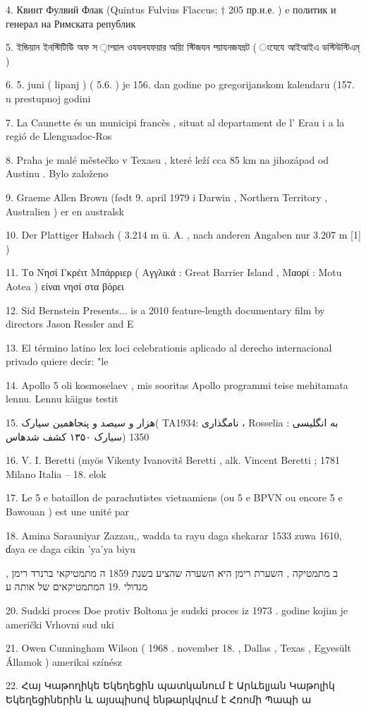 4. Квинт Фулвий Флак (Quintus Fulvius Flaccus; † 205 пр.н.е. ) e политик и генерал на
Римската републик

5. ইন্ডিয়ান ইনস্টিটিউি অফ স ়াশ্য়াল ওযযলযফয়ার অয়াি স্টিজযন ম্য়াযনজযম্ন্ট
( ংযেযে আইআইএ ডস্টিউস্টিএম্ )

6. 5. juni ( lipanj ) ( 5.6. ) je 156. dan godine po gregorijanskom kalendaru (157. u
prestupnoj godini

7. La Caunette és un municipi francès , situat al departament de l' Erau i a la regió de
Llenguadoc-Ros

8. Praha je malé městečko v Texasu , které leží cca 85 km na jihozápad od Austinu . Bylo
založeno

9. Graeme Allen Brown (født 9. april 1979 i Darwin , Northern Territory , Australien ) er
en australsk

10. Der Plattiger Habach ( 3.214 m ü. A. , nach anderen Angaben nur 3.207 m [1] )

11. Το Νησί Γκρέιτ Μπάρριερ ( Αγγλικά : Great Barrier Island , Μαορί : Motu Aotea )
είναι νησί στα βόρει

12. Sid Bernstein Presents... is a 2010 feature-length documentary film by directors Jason
Ressler and E

13. El término latino lex loci celebrationis aplicado al derecho internacional privado quiere
decir: "le

14. Apollo 5 oli kosmoselaev , mis sooritas Apollo programmi teise mehitamata lennu.
Lennu käigus testit

15. هزار و سیصد و پنجاهمین سیارک( TAنامگذاری :1934 ، Rosselia به انگلیسی : 1350 (سیارک ۱۳۵۰ کشف شدهاس

16. V. I. Beretti (myös Vikenty Ivanovitš Beretti , alk. Vincent Beretti ; 1781 Milano Italia -- 18. elok

17. Le 5 e bataillon de parachutistes vietnamiens (ou 5 e BPVN ou encore 5 e Bawouan )
est une unité par

18. Amina Sarauniyar Zazzau,, wadda ta rayu daga shekarar 1533 zuwa 1610, ɗaya ce daga
cikin 'ya'ya biyu

ב מתמטיקה , השערת רימן היא השערה שהציע בשנת 1859 ה מתמטיקאי ברנרד רימן , מגדולי .19
המתמטיקאים של אותה ע

20. Sudski proces Doe protiv Boltona je sudski proces iz 1973 . godine kojim je američki
Vrhovni sud uki

21. Owen Cunningham Wilson ( 1968 . november 18. , Dallas , Texas , Egyesült Államok )
amerikai színész

22. Հայ Կաթողիկե Եկեղեցին պատկանում է Արևելյան Կաթոլիկ Եկեղեցիներին և
այսպիսով ենթարկվում է Հռոմի Պապի ա

